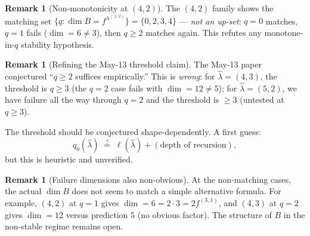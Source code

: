\documentclass[11pt]{article}
\theoremstyle{definition}
\newtheorem{remark}[theorem]{Remark}
\begin{document}
\begin{remark}[Non-monotonicity at $(4, 2)$]\label{rem:non-monotone}
The $(4, 2)$ family shows the matching set
$\{q : \dim B = f^{\lambda^{(\ge 2)}}\} = \{0, 2, 3, 4\}$ — \emph{not an up-set}:
$q = 0$ matches, $q = 1$ fails ($\dim = 6 \ne 3$), then $q \ge 2$ matches again. This refutes any monotone-in-$q$ stability hypothesis.
\end{remark}

\begin{remark}[Refining the May-13 threshold claim]\label{rem:thresh-refined}
The May-13 paper conjectured ``$q \ge 2$ suffices empirically.'' This is
\emph{wrong}: for $\widehat\lambda = (4, 3)$, the threshold is
$q \ge 3$ (the $q = 2$ case fails with $\dim = 12 \ne 5$); for
$\widehat\lambda = (5, 2)$, we have failure all the way through $q = 2$
and the threshold is $\ge 3$ (untested at $q \ge 3$).

The threshold should be conjectured shape-dependently. A first guess:
\[
   q_0(\widehat\lambda) \;\stackrel{?}{=}\; \ell(\widehat\lambda) + (\text{depth of recursion}),
\]
but this is heuristic and unverified.
\end{remark}

\begin{remark}[Failure dimensions also non-obvious]\label{rem:fail-dims}
At the non-matching cases, the actual $\dim B$ does not seem to match a
simple alternative formula. For example, $(4, 2)$ at $q = 1$ gives
$\dim = 6 = 2 \cdot 3 = 2 f^{(3, 1)}$, and $(4, 3)$ at $q = 2$ gives
$\dim = 12$ versus prediction $5$ (no obvious factor). The structure
of $B$ in the non-stable regime remains open.
\end{remark}
\end{document}
